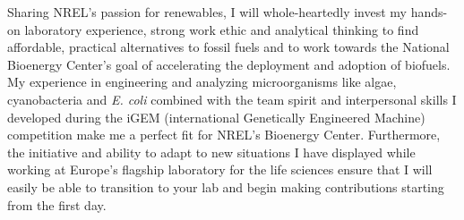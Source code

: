 \documentclass[11pt,a4paper,sans]{moderncv}
\date{\today}
\begin{document}
     
\makelettertitle
\begin{spacing}{1.15}



Sharing NREL's passion for renewables, I will whole-heartedly invest my hands-on laboratory experience, strong work ethic and analytical thinking to find affordable, practical alternatives to fossil fuels and to work towards the National Bioenergy Center's goal of accelerating the deployment and adoption of biofuels.
My experience in engineering and analyzing microorganisms like algae, cyanobacteria and \textit{E. coli} combined with the team spirit and interpersonal skills I developed during  the iGEM (international Genetically Engineered Machine) competition make me a perfect fit for NREL's Bioenergy Center. 
Furthermore, the initiative and ability to adapt to new situations I have displayed while working at Europe's flagship laboratory for the life sciences ensure that I will easily be able to transition to your lab and begin making contributions  starting from the first day.

\par\vspace*{1mm}


\end{spacing}
\end{document}
